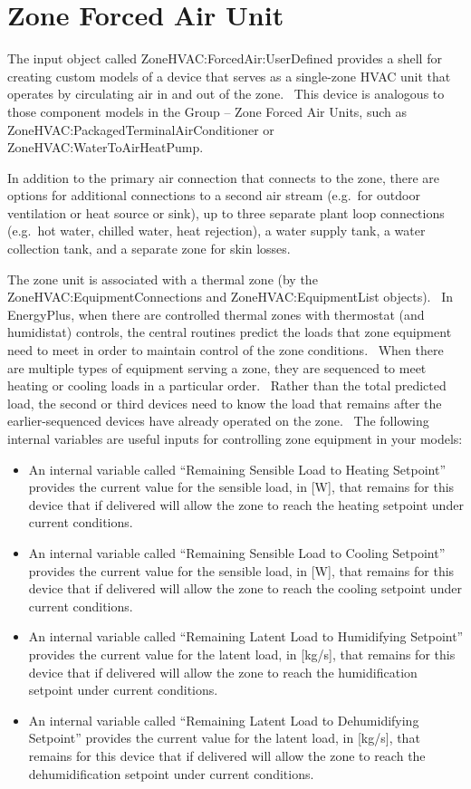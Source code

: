 \section{Zone Forced Air Unit}\label{zone-forced-air-unit}

The input object called ZoneHVAC:ForcedAir:UserDefined provides a shell for creating custom models of a device that serves as a single-zone HVAC unit that operates by circulating air in and out of the zone.~ This device is analogous to those component models in the Group -- Zone Forced Air Units, such as ZoneHVAC:PackagedTerminalAirConditioner or ZoneHVAC:WaterToAirHeatPump.

In addition to the primary air connection that connects to the zone, there are options for additional connections to a second air stream (e.g.~for outdoor ventilation or heat source or sink), up to three separate plant loop connections (e.g.~hot water, chilled water, heat rejection), a water supply tank, a water collection tank, and a separate zone for skin losses.

The zone unit is associated with a thermal zone (by the ZoneHVAC:EquipmentConnections and ZoneHVAC:EquipmentList objects).~ In EnergyPlus, when there are controlled thermal zones with thermostat (and humidistat) controls, the central routines predict the loads that zone equipment need to meet in order to maintain control of the zone conditions.~ When there are multiple types of equipment serving a zone, they are sequenced to meet heating or cooling loads in a particular order.~ Rather than the total predicted load, the second or third devices need to know the load that remains after the earlier-sequenced devices have already operated on the zone.~ The following internal variables are useful inputs for controlling zone equipment in your models:

\begin{itemize}
\item
  An internal variable called ``Remaining Sensible Load to Heating Setpoint'' provides the current value for the sensible load, in {[}W{]}, that remains for this device that if delivered will allow the zone to reach the heating setpoint under current conditions.
\item
  An internal variable called ``Remaining Sensible Load to Cooling Setpoint'' provides the current value for the sensible load, in {[}W{]}, that remains for this device that if delivered will allow the zone to reach the cooling setpoint under current conditions.
\item
  An internal variable called ``Remaining Latent Load to Humidifying Setpoint'' provides the current value for the latent load, in {[}kg/s{]}, that remains for this device that if delivered will allow the zone to reach the humidification setpoint under current conditions.
\item
  An internal variable called ``Remaining Latent Load to Dehumidifying Setpoint'' provides the current value for the latent load, in {[}kg/s{]}, that remains for this device that if delivered will allow the zone to reach the dehumidification setpoint under current conditions.
\end{itemize}

